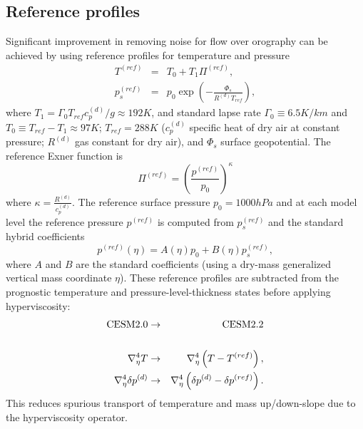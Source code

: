 \documentclass[draft]{agujournal2019}
\begin{document}
\subsection{Reference profiles}
Significant improvement in removing noise for flow over orography can be achieved by using reference profiles for temperature and pressure
\begin{eqnarray}
  T^{(ref)}&=&T_0+T_1 \Pi^{(ref)},\\
  p_s^{(ref)}&=&p_0\exp{\left(-\frac{\Phi_s}{R^{(d)}T_{ref}}\right)},
\end{eqnarray}
 \cite{SJ1991QJRMS} where $T_1=\Gamma_0 T_{ref} c_p^{(d)}/g\approx 192K$, {\color{blue}{with gravity $g$,}} and standard lapse rate $\Gamma_0\equiv 6.5K/km$ and $T_0\equiv T_{ref}-T_1\approx 97K$; $T_{ref}=288K$ ($c_p^{(d)}$ specific heat of dry air at constant pressure; $R^{(d)}$ gas constant for dry air), and $\Phi_s$ {\color{blue}{is the}} surface geopotential. The reference Exner function is
\begin{equation}
   \Pi^{(ref)}=\left( \frac{p^{(ref)}}{p_0}\right)^{\kappa}
\end{equation}
where $\kappa=\frac{R^{(d)}}{c_p^{(d)}}$. The reference surface pressure $p_0=1000hPa$ and at each model level the reference pressure $p^{(ref)}$ is computed from $p_s^{(ref)}$ and the standard hybrid coefficients
\begin{equation}
    p^{(ref)}(\eta) = A(\eta)p_0+B(\eta)p_s^{(ref)},
\end{equation}
where $A$ and $B$ are the standard {\color{blue}{hybrid}} coefficients (using a dry-mass generalized vertical mass coordinate $\eta$). These reference profiles are subtracted from the prognostic temperature and pressure-level-thickness states before applying hyperviscosity:
\begin{eqnarray}
   \hbox{CESM2.0}&\rightarrow&\hbox{CESM2.2}\nonumber \\
   && \nonumber \\
  \nabla^4_\eta T &\rightarrow& \nabla^4_\eta \left(T-T^{(ref)}\right),\label{eq:hyperT}\\ 
    \nabla^4_\eta \delta p^{(d)} &\rightarrow& \nabla^4_\eta \left(\delta p^{(d)}-\delta p^{(ref)}\right).\label{eq:hyperDP}
\end{eqnarray}
This reduces spurious transport of temperature and mass up/down-slope due to the hyperviscosity operator. 
\end{document}
